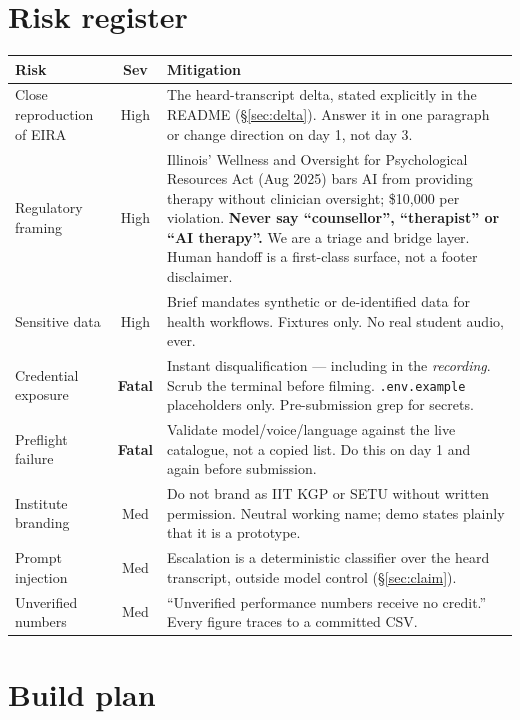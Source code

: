 \documentclass[11pt,a4paper]{article}
\newcommand{\code}[1]{\texttt{\small #1}}
\begin{document}
\section{Risk register}
\label{sec:risk}

\begin{longtable}{@{}p{3.4cm}cp{9.3cm}@{}}
\toprule
\textbf{Risk} & \textbf{Sev} & \textbf{Mitigation} \\
\midrule
\endhead
Close reproduction of EIRA & High & The heard-transcript delta, stated explicitly in the README (\S\ref{sec:delta}). Answer it in one paragraph or change direction on day 1, not day 3. \\
\addlinespace
Regulatory framing & High & Illinois' Wellness and Oversight for Psychological Resources Act (Aug 2025) bars AI from providing therapy without clinician oversight; \$10{,}000 per violation. \textbf{Never say ``counsellor'', ``therapist'' or ``AI therapy''.} We are a triage and bridge layer. Human handoff is a first-class surface, not a footer disclaimer. \\
\addlinespace
Sensitive data & High & Brief mandates synthetic or de-identified data for health workflows. Fixtures only. No real student audio, ever. \\
\addlinespace
Credential exposure & \textbf{Fatal} & Instant disqualification --- including in the \emph{recording}. Scrub the terminal before filming. \code{.env.example} placeholders only. Pre-submission grep for secrets. \\
\addlinespace
Preflight failure & \textbf{Fatal} & Validate model/voice/language against the live catalogue, not a copied list. Do this on day 1 and again before submission. \\
\addlinespace
Institute branding & Med & Do not brand as IIT KGP or SETU without written permission. Neutral working name; demo states plainly that it is a prototype. \\
\addlinespace
Prompt injection & Med & Escalation is a deterministic classifier over the heard transcript, outside model control (\S\ref{sec:claim}). \\
\addlinespace
Unverified numbers & Med & ``Unverified performance numbers receive no credit.'' Every figure traces to a committed CSV. \\
\bottomrule
\end{longtable}

\section{Build plan}
\end{document}
